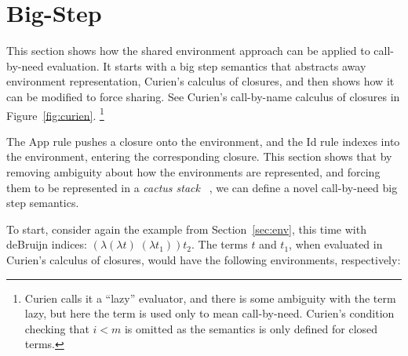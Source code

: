 \section{Big-Step \ce} \label{sec:calc}

This section shows how the shared environment approach can be applied to
call-by-need evaluation. It starts with a big step semantics that abstracts away
environment representation, Curien's calculus of closures, and then shows how it
can be modified to force sharing. See Curien's call-by-name calculus of closures
in Figure~\ref{fig:curien}. \footnote{Curien calls it a ``lazy'' evaluator, and
there is some ambiguity with the term lazy, but here the term is used only to
mean call-by-need. Curien's condition checking that $i < m$ is omitted as the
semantics is only defined for closed terms.}

The App rule pushes a closure onto the environment, and the Id rule indexes into
the environment, entering the corresponding closure. This section shows that by
removing ambiguity about how the environments are represented, and forcing them
to be represented in a \emph{cactus stack} ~\cite{stenstrom1988vlsi}, we can
define a novel call-by-need big step semantics.

To start, consider again the example from Section~\ref{sec:env}, this time with
deBruijn indices: $(\lambda(\lambda t) \; (\lambda t_1)) t_2$.  The terms $t$
and $t_1$, when evaluated in Curien's calculus of closures, would have the
following environments, respectively: 

\begin{center}
\end{center}

